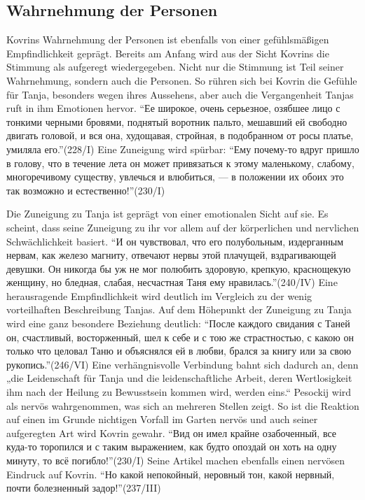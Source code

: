 \documentclass[12pt,headsepline,a4paper]{scrartcl}
\newcommand\textcyr[1]{{\fontencoding{OT2}\fontfamily{wncyr}\selectfont ``#1''}}
\begin{document}
\subsection{Wahrnehmung der Personen}
Kovrins Wahrnehmung der Personen ist ebenfalls von einer gefühlsmäßigen Empfindlichkeit geprägt.
Bereits am Anfang wird aus der Sicht Kovrins die Stimmung als aufgeregt wiedergegeben. Nicht
nur die Stimmung ist Teil seiner Wahrnehmung, sondern auch die Personen. So rühren sich bei
Kovrin die Gefühle für Tanja, besonders wegen ihres Aussehens, aber auch die Vergangenheit
Tanjas ruft in ihm Emotionen hervor. \textcyr{Ее широкое, очень серьезное, озябшее лицо с тонкими
черными бровями, поднятый воротник пальто, мешавший ей свободно двигать головой, и вся
она, худощавая, стройная, в подобранном от росы платье, умиляла его.}(228/I) Eine
Zuneigung wird spürbar: \textcyr{Ему почему-то вдруг пришло в голову, что в течение лета он может
привязаться к этому маленькому, слабому, многоречивому существу, увлечься и влюбиться,
— в положении их обоих это так возможно и естественно!}(230/I)

Die Zuneigung zu Tanja ist geprägt von einer emotionalen Sicht auf sie. Es scheint, dass seine
Zuneigung zu ihr vor allem auf der körperlichen und nervlichen Schwächlichkeit basiert. \textcyr{И он
чувствовал, что его полубольным, издерганным нервам, как железо магниту, отвечают нервы
этой плачущей, вздрагивающей девушки. Он никогда бы уж не мог полюбить здоровую,
крепкую, краснощекую женщину, но бледная, слабая, несчастная Таня ему
нравилась.}(240/IV) Eine herausragende Empfindlichkeit wird deutlich im Vergleich zu der wenig
vorteilhaften Beschreibung Tanjas. Auf dem Höhepunkt der Zuneigung zu Tanja wird eine ganz
besondere Beziehung deutlich: \textcyr{После каждого свидания с Таней он, счастливый,
восторженный, шел к себе и с тою же страстностью, с какою он только что целовал Таню и
объяснялся ей в любви, брался за книгу или за свою рукопись.}(246/VI) Eine verhängnisvolle
Verbindung bahnt sich dadurch an, denn „die Leidenschaft für Tanja und die leidenschaftliche
Arbeit, deren Wertlosigkeit ihm nach der Heilung zu Bewusstsein kommen wird, werden eins.“\autocite[96]{freise91}
Pesockij wird als nervös wahrgenommen, was sich an mehreren Stellen zeigt. So ist die Reaktion
auf einen im Grunde nichtigen Vorfall im Garten nervös und auch seiner aufgeregten Art wird
Kovrin gewahr. \textcyr{Вид он имел крайне озабоченный, все куда-то торопился и с таким
выражением, как будто опоздай он хоть на одну минуту, то всё погибло!}(230/I) Seine Artikel
machen ebenfalls einen nervösen Eindruck auf Kovrin. \textcyr{Но какой непокойный, неровный тон,
какой нервный, почти болезненный задор!}(237/III)
\end{document}
